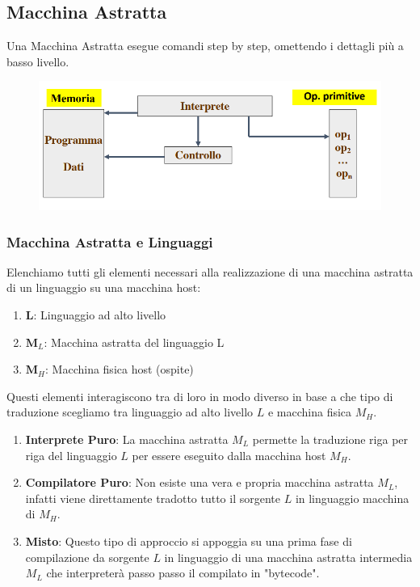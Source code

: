\documentclass{article}
\begin{document}
\subsection{Macchina Astratta}

Una Macchina Astratta esegue comandi step by step, omettendo i dettagli più a basso livello.

\vspace*{15px}

\begin{figure}[htbp]
    \center
    \includegraphics[scale=0.55]{img/macchinaAstratta1.png}
\end{figure}

\newpage

\subsubsection{Macchina Astratta e Linguaggi}

Elenchiamo tutti gli elementi necessari alla realizzazione di una macchina astratta di un linguaggio su una macchina host:

\begin{enumerate}
    \item $\textbf{L}$: Linguaggio ad alto livello
    \item $\textbf{M}_{L}$: Macchina astratta del linguaggio L
    \item $\textbf{M}_{H}$: Macchina fisica host (ospite) 
\end{enumerate}

Questi elementi interagiscono tra di loro in modo diverso in base a che tipo di traduzione scegliamo tra linguaggio ad alto livello \textbf{$L$} e macchina fisica \textbf{$M_{H}$}. 

\begin{enumerate}
    \item \textbf{Interprete Puro}: La macchina astratta \textbf{$M_{L}$} permette la traduzione riga per riga del linguaggio \textbf{$L$} per essere eseguito dalla macchina host \textbf{$M_{H}$}.
    \item \textbf{Compilatore Puro}: Non esiste una vera e propria macchina astratta \textbf{$M_{L}$}, infatti viene direttamente tradotto tutto il sorgente \textbf{$L$} in linguaggio macchina di \textbf{$M_{H}$}.
    \item \textbf{Misto}: Questo tipo di approccio si appoggia su una prima fase di compilazione da sorgente \textbf{$L$} in linguaggio di una macchina astratta intermedia \textbf{$M_{L}$} che interpreterà passo passo il compilato in "bytecode".
\end{enumerate}
\end{document}
